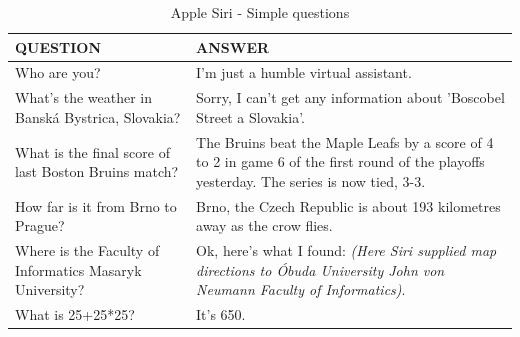 \documentclass[
  digital, %
  oneside, %
  table,   %
  lof,     %
  lot,     %
]{fithesis3}
\begin{document}
\begin{table}[H]
    \begin{tabular}{ | p{6cm} | p{6cm} |}
    \hline
    QUESTION & ANSWER \\
    \hline
    Who are you? 
    & 
    I'm just a humble virtual assistant.
    \\
    \hline
    What's the weather in Banská Bystrica, Slovakia?
    &
    Sorry, I can't get any information about 'Boscobel Street a Slovakia'.
    \\
    \hline
    What is the final score of last Boston Bruins match?
    &
    The Bruins beat the Maple Leafs by a score of 4 to 2 in game 6 of the first round of the playoffs yesterday. The series is now tied, 3-3.
    \\
    \hline
    How far is it from Brno to Prague?
    &
    Brno, the Czech Republic is about 193 kilometres away as the crow flies.
    \\
    \hline
    Where is the Faculty of Informatics Masaryk University?
    &
    Ok, here's what I found: \textit{(Here Siri supplied map directions to Óbuda University John von Neumann Faculty of Informatics)}.
    \\
    \hline
    What is 25+25*25?
    & 
    It's 650.
    \\
    \hline
    \end{tabular}
    \caption{Apple Siri - Simple questions}
    \label{tab:siri_simple_questions}
\end{table}
\end{document}
